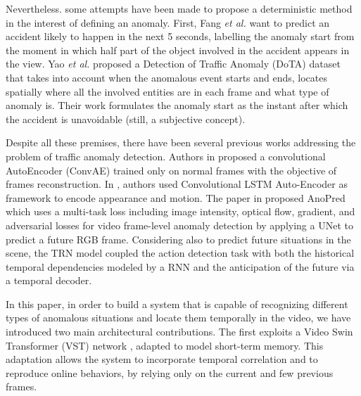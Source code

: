Nevertheless. some attempts have been made to propose a deterministic method in the interest of defining an anomaly.
First, Fang \emph{et al.} \cite{fang2019dada} want to predict an accident likely to happen in the next 5 seconds, labelling the anomaly start from the moment in which half part of the object involved in the accident appears in the view.
Yao \emph{et al.} \cite{yao2020when} proposed a Detection of Traffic Anomaly (DoTA) dataset that takes into account when the anomalous event starts and ends, locates spatially where all the involved entities are in each frame and what type of anomaly is. Their work formulates the anomaly start as the instant after which the accident is unavoidable (still, a subjective concept).

Despite all these premises, there have been several previous works addressing the problem of traffic anomaly detection. Authors in \cite{hasan2016learning} proposed a convolutional AutoEncoder (ConvAE) trained only on normal frames with the objective of frames reconstruction.
In \cite{luo2017remembering, wang2018abnormal}, authors used Convolutional LSTM Auto-Encoder as framework to encode appearance and motion. The paper in \cite{liu2018future} proposed 
AnoPred which uses a multi-task loss including image intensity, optical flow, gradient, and adversarial losses for video frame-level anomaly detection by applying a UNet to predict a future RGB frame.
Considering also to predict future situations in the scene, the TRN model \cite{xu2019temporal} coupled the action detection task with both the historical temporal dependencies modeled by a RNN and the anticipation of the future via a temporal decoder. 

In this paper, in order to build a system that is capable of recognizing different types of anomalous situations and locate them temporally in the video, we have introduced two main architectural contributions. The first exploits a Video Swin Transformer (VST) network \cite{liu_video_2022}, adapted to model short-term memory. This adaptation allows the system to incorporate temporal correlation and to reproduce online behaviors, by relying only on the current and few previous frames.

